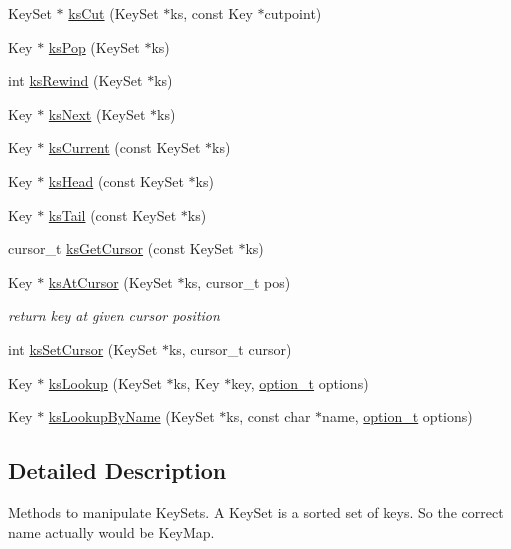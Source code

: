 \begin{DoxyCompactItemize}
Key\-Set $\ast$ \hyperlink{group__keyset_ga6b00cf82b59af4d883a9bad6cf4a4a4a}{ks\-Cut} (Key\-Set $\ast$ks, const Key $\ast$cutpoint)
\item 
Key $\ast$ \hyperlink{group__keyset_gae42530b04defb772059de0600159cf69}{ks\-Pop} (Key\-Set $\ast$ks)
\item 
int \hyperlink{group__keyset_gabe793ff51f1728e3429c84a8a9086b70}{ks\-Rewind} (Key\-Set $\ast$ks)
\item 
Key $\ast$ \hyperlink{group__keyset_ga317321c9065b5a4b3e33fe1c399bcec9}{ks\-Next} (Key\-Set $\ast$ks)
\item 
Key $\ast$ \hyperlink{group__keyset_ga4287b9416912c5f2ab9c195cb74fb094}{ks\-Current} (const Key\-Set $\ast$ks)
\item 
Key $\ast$ \hyperlink{group__keyset_gae7dbf3aef70e67b5328475eb3d1f92f5}{ks\-Head} (const Key\-Set $\ast$ks)
\item 
Key $\ast$ \hyperlink{group__keyset_gadca442c4ab43cf532b15091d7711559e}{ks\-Tail} (const Key\-Set $\ast$ks)
\item 
cursor\-\_\-t \hyperlink{group__keyset_gaffe507ab9281c322eb16c3e992075d29}{ks\-Get\-Cursor} (const Key\-Set $\ast$ks)
\item 
Key $\ast$ \hyperlink{group__keyset_ga3604cc41505f7e19db945cece67190b6}{ks\-At\-Cursor} (Key\-Set $\ast$ks, cursor\-\_\-t pos)
\begin{DoxyCompactList}\small\item\em return key at given cursor position \end{DoxyCompactList}\item 
int \hyperlink{group__keyset_gad94c9ffaa3e8034564c0712fd407c345}{ks\-Set\-Cursor} (Key\-Set $\ast$ks, cursor\-\_\-t cursor)
\item 
Key $\ast$ \hyperlink{group__keyset_gaa34fc43a081e6b01e4120daa6c112004}{ks\-Lookup} (Key\-Set $\ast$ks, Key $\ast$key, \hyperlink{group__kdb_ga98a3d6a4016c9dad9cbd1a99a9c2a45a}{option\-\_\-t} options)
\item 
Key $\ast$ \hyperlink{group__keyset_gad2e30fb6d4739d917c5abb2ac2f9c1a1}{ks\-Lookup\-By\-Name} (Key\-Set $\ast$ks, const char $\ast$name, \hyperlink{group__kdb_ga98a3d6a4016c9dad9cbd1a99a9c2a45a}{option\-\_\-t} options)
\end{DoxyCompactItemize}


\subsection{Detailed Description}
Methods to manipulate Key\-Sets. A Key\-Set is a sorted set of keys. So the correct name actually would be Key\-Map.

